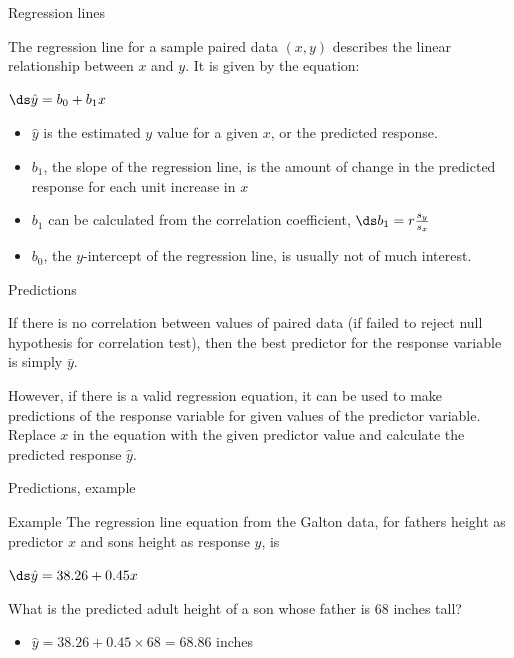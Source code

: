 \documentclass[xcolor=table]{beamer}
\begin{document}
\begin{frame}{Regression lines}
\begin{block}{}
\large
The regression line for a sample paired data $(x,y)$ describes the linear relationship between $x$ and $y$. It is given by the equation:\\
\medskip
{\centering \Large
$\ds \hat y = b_0 + b_1 x$
\par}
\smallskip
\begin{itemize}
\pause\item $\hat y$ is the estimated $y$ value for a given $x$, or the predicted response.
\pause\item $b_1$, the slope of the regression line, is the amount of change in the predicted response for each unit increase in $x$
\pause\item $b_1$ can be calculated from the correlation coefficient, $\ds b_1 = r \frac{s_y}{s_x}$
\pause\item $b_0$, the $y$-intercept of the regression line, is usually not of much interest.
\end{itemize}
\end{block}
\end{frame}

\begin{frame}{Predictions}
\begin{block}{}
\large
If there is no correlation between values of paired data (if failed to reject null hypothesis for correlation test), then the best predictor for the response variable is simply $\bar y$.
\end{block}

\pause
\begin{block}{}
\large
However, if there is a valid regression equation, it can be used to make predictions of the response variable for given values of the predictor variable. Replace $x$ in the equation with the given predictor value and calculate the predicted response $\hat y$.
\end{block}
\end{frame}

\begin{frame}{Predictions, example}
\begin{exampleblock}{Example}
\large
The regression line equation from the Galton data, for fathers height as predictor $x$ and sons height as response $y$, is \\
\smallskip
{\centering
$\ds \hat y = 38.26 + 0.45 x$
\par}
\smallskip
What is the predicted adult height of a son whose father is 68 inches tall?
\begin{itemize}
\pause\item $\hat y = 38.26 + 0.45 \times 68 = 68.86$ inches
\end{itemize}
\end{exampleblock}
\end{frame}
\end{document}

